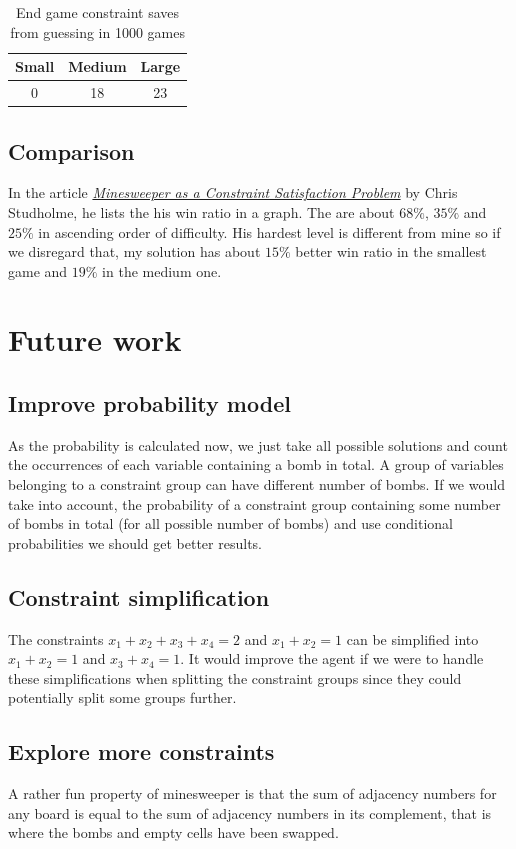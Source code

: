 \documentclass[11pt,a4paper,notitlepage]{article}
\theoremstyle{definition}
\begin{document}
\begin{table}[H]
\begin{center}
\begin{tabular}{c|c|c}
Small & Medium & Large \\
\hline
0 & 18 & 23
\end{tabular}
\end{center}
\caption{End game constraint saves from guessing in 1000 games}
\label{table:egs}
\end{table}
\subsection{Comparison}
In the article \href{http://www.cs.toronto.edu/~cvs/minesweeper/minesweeper.pdf}{\emph{Minesweeper as a Constraint Satisfaction Problem}} by Chris Studholme, he lists the his win ratio in a graph. The are about $68\%$, $35\%$ and $25\%$ in ascending order of difficulty. His hardest level is different from mine so if we disregard that, my solution has about $15\%$ better win ratio in the smallest game and $19\%$ in the medium one.


\section{Future work}
\subsection{Improve probability model}
As the probability is calculated now, we just take all possible solutions and count the occurrences of each variable containing a bomb in total. A group of variables belonging to a constraint group can have different number of bombs. If we would take into account, the probability of a constraint group containing some number of bombs in total (for all possible number of bombs) and use conditional probabilities we should get better results.

\subsection{Constraint simplification}
The constraints $x_1+x_2+x_3+x_4 = 2$ and $x_1+x_2=1$ can be simplified into $x_1+x_2 = 1$ and $x_3+x_4=1$. It would improve the agent if we were to handle these simplifications when splitting the constraint groups since they could potentially split some groups further.

\subsection{Explore more constraints}
A rather fun property of minesweeper is that the sum of adjacency numbers for any board is equal to the sum of adjacency numbers in its complement, that is where the bombs and empty cells have been swapped.
\end{document}
